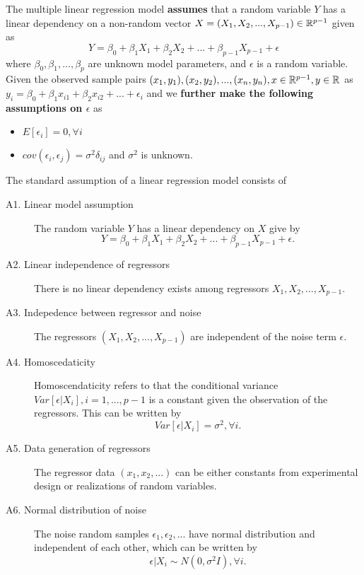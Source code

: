 \begin{refsection}
\begin{definition}\label{ch:statistical-models:def:multipleLinearRegressionModel}
	The multiple linear regression model \textbf{assumes} that a random variable $Y$ has a linear dependency on a non-random vector $X = (X_1,X_2,...,X_{p-1}) \in \mathbb{R}^{p-1}$ given as
	$$Y = \beta_0 + \beta_1 X_1 +\beta_2 X_2 + ... +\beta_{p-1} X_{p-1} + \epsilon$$
	where $\beta_0,\beta_1, ...,\beta_p$ are unknown model parameters, and $\epsilon$ is a random variable. 
	Given the observed sample pairs $(x_1,y_1),(x_2,y_2),..., (x_n,y_n), x\in \mathbb{R}^{p-1}, y\in \mathbb{R}$ as $y_i = \beta_0 + \beta_1 x_{i1} + \beta_2 x_{i2} + ... + \epsilon_i$ and we \textbf{further make the following assumptions on $\epsilon$} as
	\begin{itemize}
		\item $E[\epsilon_i] = 0,\forall i$
		\item $cov(\epsilon_i,\epsilon_j) = \sigma^2\delta_{ij}$ and $\sigma^2$ is unknown.
	\end{itemize} 	
\end{definition}

\begin{assumption}\label{ch:regression-analysis:assumption:LinearRegressionStandardAssumption} \cite[17]{greene2017econometric}
The standard assumption of a linear regression model consists of
\begin{description}
	\item[A1. Linear model assumption] The random variable $Y$ has a linear dependency on $X$ give by
	$$Y = \beta_0 + \beta_1 X_1 +\beta_2 X_2 + ... +\beta_{p-1} X_{p-1} + \epsilon.$$
	\item[A2. Linear independence of regressors] There is no linear dependency exists among regressors $X_1, X_2,...,X_{p-1}$.  
	\item[A3. Indepedence between regressor and noise] The regressors $(X_1,X_2,...,X_{p-1})$ are independent of the noise term $\epsilon$.
	\item[A4. Homoscedaticity] Homoscendaticity refers to that the conditional variance $Var[\epsilon|X_i],i=1,...,p-1$ is a constant given the observation of the regressors. This can be written by
	$$ Var[\epsilon | X_i] = \sigma^2, \forall i.$$  
	\item[A5. Data generation of regressors] The regressor data $(x_1,x_2,...)$ can be either constants from experimental design or realizations of random variables. 
	\item[A6. Normal distribution of noise] The noise random samples $\epsilon_1, \epsilon_2,...$ have normal distribution and independent of each other, which can be written by
	$$\epsilon | X_i \sim N(0, \sigma^2 I), \forall i.$$ 
\end{description}	
\end{assumption}




\end{refsection}
